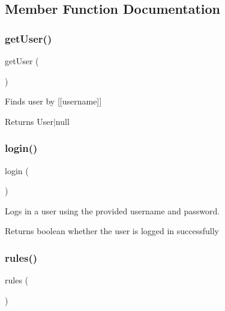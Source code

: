 \subsection{Member Function Documentation}
\hypertarget{classapp_1_1models_1_1_login_form_ae81b7186fb97a7c6457edcc68c9aa2ef}{}\label{classapp_1_1models_1_1_login_form_ae81b7186fb97a7c6457edcc68c9aa2ef} 
\subsubsection{\texorpdfstring{get\+User()}{getUser()}}
{\footnotesize\ttfamily get\+User (\begin{DoxyParamCaption}{ }\end{DoxyParamCaption})}

Finds user by \mbox{[}\mbox{[}username\mbox{]}\mbox{]}

\begin{DoxyReturn}{Returns}
User$\vert$null 
\end{DoxyReturn}
\hypertarget{classapp_1_1models_1_1_login_form_aa311da27ba5706f5710cea7706c8eae1}{}\label{classapp_1_1models_1_1_login_form_aa311da27ba5706f5710cea7706c8eae1} 
\subsubsection{\texorpdfstring{login()}{login()}}
{\footnotesize\ttfamily login (\begin{DoxyParamCaption}{ }\end{DoxyParamCaption})}

Logs in a user using the provided username and password. \begin{DoxyReturn}{Returns}
boolean whether the user is logged in successfully 
\end{DoxyReturn}
\hypertarget{classapp_1_1models_1_1_login_form_a17dba92d96b9dd48c62f3ede3eef94d4}{}\label{classapp_1_1models_1_1_login_form_a17dba92d96b9dd48c62f3ede3eef94d4} 
\subsubsection{\texorpdfstring{rules()}{rules()}}
{\footnotesize\ttfamily rules (\begin{DoxyParamCaption}{ }\end{DoxyParamCaption})}

